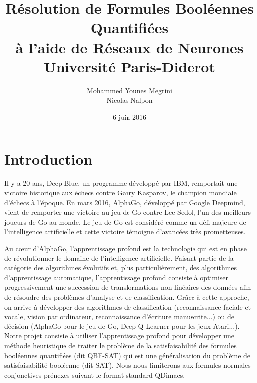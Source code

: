 \documentclass{article}
\begin{document}
\title{
    {\Large\textbf{Résolution de Formules Booléennes Quantifiées\\à l'aide de Réseaux de Neurones}}\\
	{\large Université Paris-Diderot}
}
\author{
	{Mohammed Younes Megrini}\\
	{Nicolas Nalpon}
}
\date{6 juin 2016}
\maketitle
\newpage

\tableofcontents
\newpage

\tableofcontents
\newpage

\section{Introduction}
Il y a 20 ans, Deep Blue, un programme développé par IBM, remportait une victoire historique aux échecs contre Garry Kasparov, le champion mondiale d'échecs à l'époque. En mars 2016, AlphaGo, développé par Google Deepmind, vient de remporter une victoire au jeu de Go contre Lee Sedol, l'un des meilleurs joueurs de Go au monde. Le jeu de Go est considéré comme un défi majeure de l'intelligence artificielle et cette victoire témoigne d'avancées très prometteuses.

Au cœur d'AlphaGo, l'apprentissage profond est la technologie qui est en phase de révolutionner le domaine de l'intelligence artificielle. Faisant partie de la catégorie des algorithmes évolutifs et, plus particulièrement, des algorithmes d'apprentissage automatique, l'apprentissage profond consiste à optimiser progressivement une succession de transformations non-linéaires des données afin de résoudre des problèmes d'analyse et de classification. Grâce à cette approche, on arrive à développer des algorithmes de classification (reconnaissance faciale et vocale, vision par ordinateur, reconnaissance d'écriture manuscrite...) ou de décision (AlphaGo pour le jeu de Go, Deep Q-Learner pour les jeux Atari...).\\

Notre projet consiste à utiliser l'apprentissage profond pour développer une méthode heuristique de traiter le problème de la satisfaisabilité des formules booléennes quantifiées (dit QBF-SAT) qui est une généralisation du problème de satisfaisabilité booléenne (dit SAT). Nous nous limiterons aux formules normales conjonctives prénexes suivant le format standard QDimacs.
\end{document}

